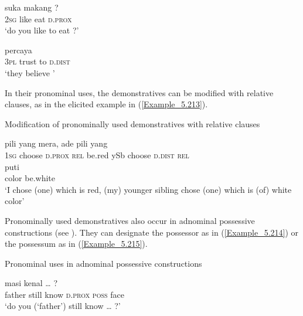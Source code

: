 \ea
\label{Example_5.211}
 {suka} {makang} {}?\\ %
 \textsc{2sg}  like  eat  \textsc{d.prox}\\
 ‘do you like to eat ?’ \textstyleExampleSource{[081006-023-CvEx.0071-0072]}
\z

\ea
\label{Example_5.212}
 {percaya} {} {}\\ %
 \textsc{3pl}  trust  to  \textsc{d.dist}\\
 ‘they believe ’ \textstyleExampleSource{[081006-023-CvEx.0001]}
\z


In their pronominal uses, the demonstratives can be modified with relative clauses, as in the elicited example in (\ref{Example_5.213}).


\begin{styleExampleTitle}
Modification of pronominally used demonstratives with relative clauses
\end{styleExampleTitle}

\ea
\label{Example_5.213}
 {{pili}} {} {yang} {mera,} {ade} {pili} {} {yang}\\ %
 \textsc{1sg}  {choose}  \textsc{d.prox}  \textsc{rel}  be.red  ySb  choose  \textsc{d.dist}  \textsc{rel}\\
   {puti}\\
 {color}  {be.white}\\
 ‘I chose  (one) which is red, (my) younger sibling chose  (one) which is (of) white color’ \textstyleExampleSource{[Elicited MY131119.004]}
\z


Pronominally used demonstratives also occur in adnominal possessive constructions (see ). They can designate the possessor as in (\ref{Example_5.214}) or the possessum as in (\ref{Example_5.215}).


\begin{styleExampleTitle}
Pronominal uses in adnominal possessive constructions
\end{styleExampleTitle}

\ea
\label{Example_5.214}
 {masi} {kenal} {{\ldots}} {} {} {}?\\ %
 father  still  know  {}  \textsc{d.prox}  \textsc{poss}  face\\
\glt 
‘do you (‘father’) still know {\ldots} ?’ \textstyleExampleSource{[080922-001a-CvPh.1123]}
\z

